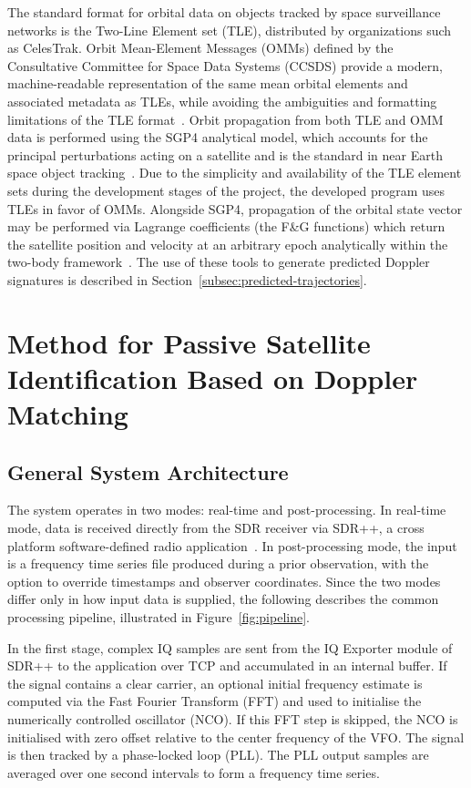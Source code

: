 \documentclass[lineno,pdflatex,sn-basic,referee,]{sn-jnl}
\begin{document}
The standard format for orbital data on objects tracked by space surveillance networks is the Two-Line Element set (TLE), distributed by organizations such as CelesTrak. Orbit Mean-Element Messages (OMMs) defined by the Consultative Committee for Space Data Systems (CCSDS) provide a modern, machine-readable representation of the same mean orbital elements and associated metadata as TLEs, while avoiding the ambiguities and formatting limitations of the TLE format~\citep{ccsds_odm}. Orbit propagation from both TLE and OMM data is performed using the SGP4 analytical model, which accounts for the principal perturbations acting on a satellite and is the standard in near Earth space object tracking~\citep{vallado2006}. Due to the simplicity and availability of the TLE element sets during the development stages of the project, the developed program uses TLEs in favor of OMMs. Alongside SGP4, propagation of the orbital state vector may be performed via Lagrange coefficients (the F\&G functions) which return the satellite position and velocity at an arbitrary epoch analytically within the two-body framework~\citep{sharifi2011, seif2017}. The use of these tools to generate predicted Doppler signatures is described in Section~\ref{subsec:predicted-trajectories}.

\section{Method for Passive Satellite Identification Based on Doppler Matching}
\label{sec:method}

\subsection{General System Architecture}
\label{subsec:architecture}

The system operates in two modes: real-time and post-processing. In real-time mode, data is received directly from the SDR receiver via SDR++, a cross platform software-defined radio application~\citep{sdrpp}. In post-processing mode, the input is a frequency time series file produced during a prior observation, with the option to override timestamps and observer coordinates. Since the two modes differ only in how input data is supplied, the following describes the common processing pipeline, illustrated in Figure~\ref{fig:pipeline}.

In the first stage, complex IQ samples are sent from the IQ Exporter module of SDR++ to the application over TCP and accumulated in an internal buffer. If the signal contains a clear carrier, an optional initial frequency estimate is computed via the Fast Fourier Transform (FFT) and used to initialise the numerically controlled oscillator (NCO). If this FFT step is skipped, the NCO is initialised with zero offset relative to the center frequency of the VFO. The signal is then tracked by a phase-locked loop (PLL). The PLL output samples are averaged over one second intervals to form a frequency time series.
\end{document}
